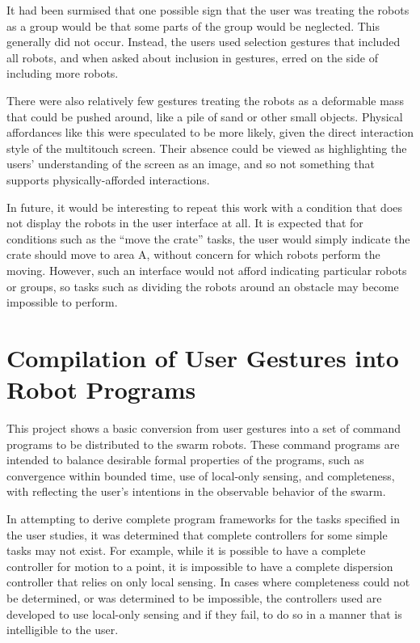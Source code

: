 It had been surmised that one possible sign that the user was treating the robots as a group would be that some parts of the group would be neglected. 
This generally did not occur. 
Instead, the users used selection gestures that included all robots, and when asked about inclusion in gestures, erred on the side of including more robots. 

There were also relatively few gestures treating the robots as a deformable mass that could be pushed around, like a pile of sand or other small objects. 
Physical affordances like this were speculated to be more likely, given the direct interaction style of the multitouch screen. 
Their absence could be viewed as highlighting the users' understanding of the screen as an image, and so not something that supports physically-afforded interactions. 

In future, it would be interesting to repeat this work with a condition that does not display the robots in the user interface at all. 
It is expected that for conditions such as the ``move the crate'' tasks, the user would simply indicate the crate should move to area A, without concern for which robots perform the moving. 
However, such an interface would not afford indicating particular robots or groups, so tasks such as dividing the robots around an obstacle may become impossible to perform. 

\section{Compilation of User Gestures into Robot Programs} \label{section:Compilation_of_User_Gestures_into_Robot_Programs}

This project shows a basic conversion from user gestures into a set of command programs to be distributed to the swarm robots.
These command programs are intended to balance desirable formal properties of the programs, such as convergence within bounded time, use of local-only sensing, and completeness, with reflecting the user's intentions in the observable behavior of the swarm. 

In attempting to derive complete program frameworks for the tasks specified in the user studies, it was determined that complete controllers for some simple tasks may not exist. 
For example, while it is possible to have a complete controller for motion to a point, it is impossible to have a complete dispersion controller that relies on only local sensing. 
In cases where completeness could not be determined, or was determined to be impossible, the controllers used are developed to use local-only sensing and if they fail, to do so in a manner that is intelligible to the user. 

